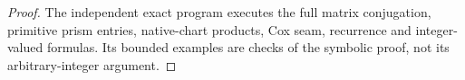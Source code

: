 \begin{proof}
The independent exact program
 executes the full
matrix conjugation, primitive prism entries, native-chart products,
Cox seam, recurrence and integer-valued formulas. Its bounded examples
are checks of the symbolic proof, not its arbitrary-integer argument.

\end{proof}
